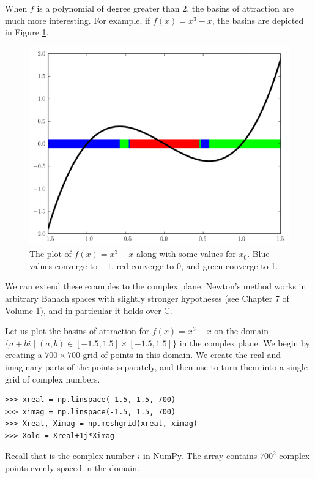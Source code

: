 When $f$ is a polynomial of degree greater than 2, the basins of attraction are much more interesting.
For example, if $f(x) = x^3-x$, the basins are depicted in Figure \ref{fig:fractal_1d}.

\begin{figure}
\begin{center}
\includegraphics[scale=0.5]{fractal1d}
\caption{The plot of $f(x) = x^3 -x$ along with some values for $x_0$.
Blue values converge to $-1$, red converge to 0, and green converge to 1.}
\label{fig:fractal_1d}
\end{center}
\end{figure}

We can extend these examples to the complex plane. 
Newton's method works in arbitrary Banach spaces with slightly stronger hypotheses (see Chapter 7 of Volume 1), and in particular it holds over $\mathbb{C}$.

Let us plot the basins of attraction for $f(x) = x^3-x$ on the domain $\{a+bi \mid (a, b) \in [-1.5, 1.5] \times [-1.5, 1.5] \}$ in the complex plane.
We begin by creating a $700 \times 700$ grid of points in this domain. 
We create the real and imaginary parts of the points separately, and then use  to turn them into a single grid of complex numbers.
\begin{lstlisting}
>>> xreal = np.linspace(-1.5, 1.5, 700)
>>> ximag = np.linspace(-1.5, 1.5, 700)
>>> Xreal, Ximag = np.meshgrid(xreal, ximag)
>>> Xold = Xreal+1j*Ximag
\end{lstlisting}
Recall that  is the complex number $i$ in NumPy. 
The array  contains $700^2$ complex points evenly spaced in the domain.

